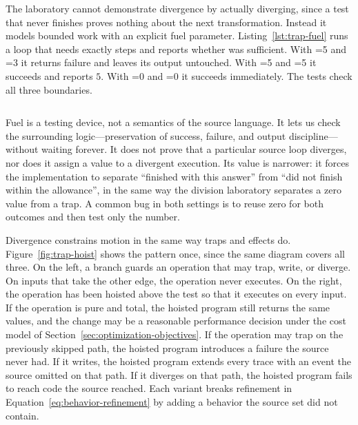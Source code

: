 The laboratory cannot demonstrate divergence by actually diverging, since a test that never finishes proves nothing about the next transformation.
Instead it models bounded work with an explicit fuel parameter.
Listing~\ref{lst:trap-fuel} runs a loop that needs exactly  steps and reports whether  was sufficient.
With =5 and =3 it returns failure and leaves its output untouched.
With =5 and =5 it succeeds and reports $5$.
With =0 and =0 it succeeds immediately.
The tests check all three boundaries.

\begin{listing}
  \inputminted[firstline=85,lastline=97]{c}{example-code/ch01/trap_lab.c}
  \caption{Fuel turns potential divergence into a checked failure.}
  \label{lst:trap-fuel}
\end{listing}

Fuel is a testing device, not a semantics of the source language.
It lets us check the surrounding logic---preservation of success, failure, and output discipline---without waiting forever.
It does not prove that a particular source loop diverges, nor does it assign a value to a divergent execution.
Its value is narrower: it forces the implementation to separate \enquote{finished with this answer} from \enquote{did not finish within the allowance}, in the same way the division laboratory separates a zero value from a trap.
A common bug in both settings is to reuse zero for both outcomes and then test only the number.

Divergence constrains motion in the same way traps and effects do.
Figure~\ref{fig:trap-hoist} shows the pattern once, since the same diagram covers all three.
On the left, a branch guards an operation that may trap, write, or diverge.
On inputs that take the other edge, the operation never executes.
On the right, the operation has been hoisted above the test so that it executes on every input.
If the operation is pure and total, the hoisted program still returns the same values, and the change may be a reasonable performance decision under the cost model of Section~\ref{sec:optimization-objectives}.
If the operation may trap on the previously skipped path, the hoisted program introduces a failure the source never had.
If it writes, the hoisted program extends every trace with an event the source omitted on that path.
If it diverges on that path, the hoisted program fails to reach code the source reached.
Each variant breaks refinement in Equation~\ref{eq:behavior-refinement} by adding a behavior the source set did not contain.

